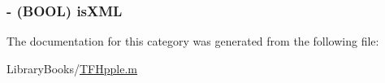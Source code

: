 \subsubsection[{is\+X\+M\+L}]{\setlength{\rightskip}{0pt plus 5cm}-\/ (B\+O\+O\+L) is\+X\+M\+L\hspace{0.3cm}{\ttfamily [protected]}}\label{category_t_f_hpple_07_08_ad2ae7e483fc2540b363e72a46a4cb196}


The documentation for this category was generated from the following file\+:\begin{DoxyCompactItemize}
\item 
Library\+Books/\hyperlink{_t_f_hpple_8m}{T\+F\+Hpple.\+m}\end{DoxyCompactItemize}
